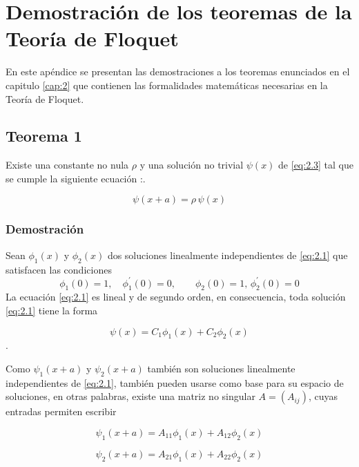 \appendix
\chapter{Demostración de los teoremas de la Teoría de Floquet}\label{apendice:A}

En este apéndice se presentan las demostraciones a los teoremas enunciados en el capitulo \ref{cap:2} que contienen las formalidades matemáticas necesarias en la Teoría de Floquet.

\section{Teorema 1}\label{apendice:A.1} 

Existe una constante no nula $\rho$ y una solución no trivial $\psi(x)$ de \ref{eq:2.3} tal que se cumple la siguiente ecuación \cite{floquet}:.

\begin{equation}\label{eq:A.1}
    \psi(x+a)=\rho \,\psi(x)
\end{equation}

\subsection*{Demostración}

Sean $\phi_1(x)$ y $\phi_2(x)$ dos soluciones linealmente independientes de \ref{eq:2.1} que satisfacen las condiciones
$$\phi_1(0)=1,\quad\phi^\prime_1(0)=0,\qquad \phi_2(0)=1,\, \phi^\prime_2(0)=0$$
La ecuación \ref{eq:2.1} es lineal y de segundo orden, en consecuencia,  toda solución \ref{eq:2.1} tiene la forma

\begin{equation}\label{eq:A.2}
    \psi(x)=C_1\phi_1(x)+C_2\phi_2(x)
\end{equation}.

Como $\psi_1(x+a)$ y $\psi_2(x+a)$ también son soluciones linealmente independientes de \ref{eq:2.1}, también pueden usarse como base para su espacio de soluciones, en otras palabras, existe una matriz no singular $A=(A_{ij})$, cuyas entradas permiten escribir 

\begin{equation}\label{eq:A.3}
    \psi_1(x+a)=A_{11}\phi_1(x)+A_{12}\phi_2(x)
\end{equation}

\begin{equation}\label{eq:A.4}
    \psi_2(x+a)=A_{21}\phi_1(x)+A_{22}\phi_2(x)
\end{equation}

